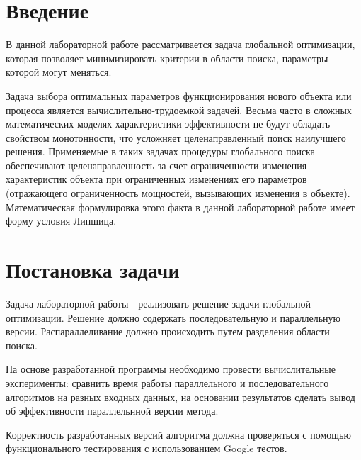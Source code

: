 \documentclass{report}
\begin{document}
\setcounter{page}{2}

\tableofcontents
\newpage

\section*{Введение}
В данной лабораторной работе рассматривается задача глобальной оптимизации, которая позволяет минимизировать критерии в области поиска, параметры которой могут меняться.
\par
Задача выбора оптимальных параметров функционирования нового объекта или процесса является вычислительно-трудоемкой задачей. Весьма часто в сложных математических моделях характеристики эффективности не будут обладать свойством монотонности, что усложняет целенаправленный поиск наилучшего решения. Применяемые в таких задачах процедуры глобального поиска обеспечивают целенаправленность за счет ограниченности изменения характеристик объекта при ограниченных изменениях его параметров (отражающего ограниченность мощностей, вызывающих изменения в объекте). Математическая формулировка этого факта в данной лабораторной работе имеет форму условия Липшица.

\newpage

\section*{Постановка задачи}
Задача лабораторной работы - реализовать решение задачи глобальной оптимизации. Решение должно содержать последовательную и параллельную версии. Распараллеливание должно происходить путем разделения области поиска.
\par
На основе разработанной программы необходимо провести вычислительные эксперименты: сравнить время работы параллельного и последовательного алгоритмов на разных входных данных, на основании результатов сделать вывод об эффективности параллельнной версии метода.
\par
Корректность разработанных версий алгоритма должна проверяться с помощью функционального тестирования с использованием Google тестов.
\newpage

\end{document}
